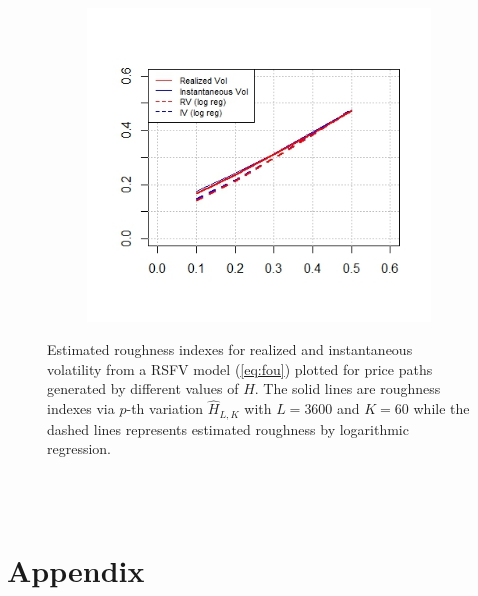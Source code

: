 \documentclass{article}
\begin{document}
\begin{figure}[htbp]
    \centering
    
    \begin{subfigure}{0.78\textwidth}
        \includegraphics[width=\linewidth]{rsfv_single.jpeg}
    \end{subfigure}
    
    \caption{Estimated roughness indexes for realized and instantaneous volatility from a RSFV model (\ref{eq:fou}) plotted for price paths generated by different values of $H$. The solid lines are roughness indexes via $p$-th variation $\hat{H}_{L,K}$ with $L = 3600$ and $K= 60$ while the dashed lines represents estimated roughness by logarithmic regression.}
    \label{fig:rsfv_single}
\end{figure}\\\\

\newpage
\section{Appendix}
\end{document}
